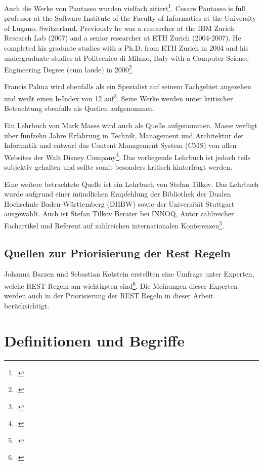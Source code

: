 Auch die Werke von Pautasso wurden vielfach zitiert\footcite[Vgl. ][]{pautasso_cesare_2021}. Cesare Pautasso is full professor at the Software Institute of the Faculty of Informatics at the University of Lugano, Switzerland. Previously he was a researcher at the IBM Zurich Research Lab (2007) and a senior researcher at ETH Zurich (2004-2007). He completed his graduate studies with a Ph.D. from ETH Zurich in 2004 and his undergraduate studies at Politecnico di Milano, Italy with a Computer Science Engineering Degree (cum laude) in 2000\footcite[Vgl. ][]{pautasso_prof_2021}.

Francis Palma wird ebenfalls als ein Spezialist auf seinem Fachgebiet angesehen und weißt einen h-Index von 12 auf\footcite[Vgl. ][]{palma_francis_2021}. Seine Werke werden unter kritischer Betrachtung ebenfalls als Quellen aufgenommen.

Ein Lehrbuch von Mark Masse wird auch als Quelle aufgenommen. Masse verfügt über fünfzehn Jahre Erfahrung in Technik, Management und Architektur der Informatik und entwarf das Content Management System (CMS) von allen Websites der Walt Disney Company\footcite[Vgl. ][]{masse_mark_2021}. Das vorliegende Lehrbuch ist jedoch teils subjektiv gehalten und sollte somit besonders kritisch hinterfragt werden.

Eine weitere betrachtete Quelle ist ein Lehrbuch von Stefan Tilkov. Das Lehrbuch wurde aufgrund einer mündlichen Empfehlung der Bibliothek der Dualen Hochschule Baden-Württemberg (DHBW) sowie der Universität Stuttgart ausgewählt. Auch ist Stefan Tilkov Berater bei INNOQ, Autor zahlreicher Fachartikel und Referent auf zahlreichen internationalen Konferenzen\footcite[Vgl. ][]{tilkov_stefan_2021}. 

\subsection{Quellen zur Priorisierung der Rest Regeln}\label{subsection:quellen-zur-priorisierung}

Johanna Barzen und Sebastian Kotstein erstellten eine Umfrage unter Experten, welche REST Regeln am wichtigsten sind\footcite[Vgl. ][]{barzen_which_2021}. Die Meinungen dieser Experten werden auch in der Priorisierung der REST Regeln in dieser Arbeit berücksichtigt.

\section{Definitionen und Begriffe}\label{subsection:definitionen-und-begriffe}

